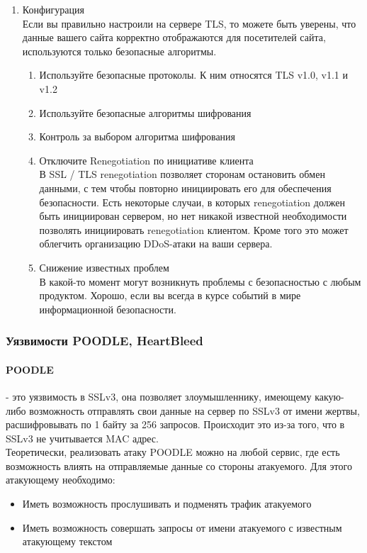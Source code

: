 \documentclass[10pt,a4paper]{report}
\begin{document}
\begin{enumerate}
\item Конфигурация \\
Если вы правильно настроили на сервере TLS, то можете быть уверены, что данные вашего сайта корректно отображаются для посетителей сайта, используются только безопасные алгоритмы.
\begin{enumerate}
\item Используйте безопасные протоколы. К ним относятся TLS v1.0, v1.1 и v1.2 
\item Используйте безопасные алгоритмы шифрования
\item Контроль за выбором алгоритма шифрования \\
\item  Отключите Renegotiation по инициативе клиента \\
В SSL / TLS renegotiation позволяет сторонам остановить обмен данными, с тем чтобы повторно инициировать его для обеспечения безопасности. Есть некоторые случаи, в которых renegotiation должен быть инициирован сервером, но нет никакой известной необходимости позволять инициировать renegotiation клиентом. Кроме того это может облегчить организацию DDoS-атаки на ваши сервера.
\item Снижение известных проблем \\
В какой-то момент могут возникнуть проблемы с безопасностью с любым продуктом. Хорошо, если вы всегда в курсе событий в мире информационной безопасности.
\end{enumerate}
\end{enumerate}
\subsubsection{Уязвимости POODLE, HeartBleed}
\paragraph{POODLE} - это уязвимость в SSLv3, она  позволяет злоумышленнику, имеющему какую-либо возможность отправлять свои данные на сервер по SSLv3 от имени жертвы, расшифровывать по 1 байту за 256 запросов. Происходит это из-за того, что в SSLv3 не учитывается MAC адрес. \\
Теоретически, реализовать атаку POODLE можно на любой сервис, где есть возможность влиять на отправляемые данные со стороны атакуемого. Для этого атакующему необходимо: 
\begin{itemize}
\item Иметь возможность прослушивать и подменять трафик атакуемого
\item Иметь возможность совершать запросы от имени атакуемого с известным атакующему текстом
\end{itemize}
\end{document}
